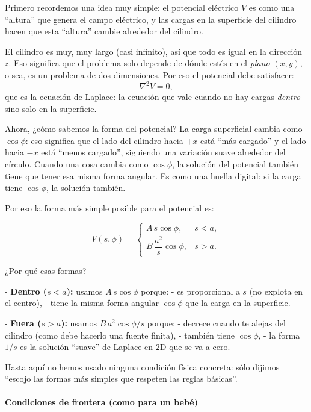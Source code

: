 \documentclass{article}
\begin{document}
Primero recordemos una idea muy simple: el potencial eléctrico $V$ es como una 
“altura” que genera el campo eléctrico, y las cargas en la superficie del 
cilindro hacen que esta “altura” cambie alrededor del cilindro.

El cilindro es muy, muy largo (casi infinito), así que todo es igual en la 
dirección $z$. Eso significa que el problema solo depende de 
dónde estés en el \emph{plano} $(x,y)$, o sea, es un problema de dos 
dimensiones. Por eso el potencial debe satisfacer:
\[
\nabla^{2}V = 0,
\]
que es la ecuación de Laplace: la ecuación que vale cuando no hay cargas 
\emph{dentro} sino solo en la superficie.

Ahora, ¿cómo sabemos la forma del potencial?  
La carga superficial cambia como $\cos\phi$: eso significa que el lado del 
cilindro hacia $+x$ está “más cargado” y el lado hacia $-x$ está “menos 
cargado”, siguiendo una variación suave alrededor del círculo.  
Cuando una cosa cambia como $\cos\phi$, la solución del potencial también tiene
que tener esa misma forma angular. Es como una huella digital: si la carga tiene
$\cos\phi$, la solución también.

Por eso la forma más simple posible para el potencial es:

\[
V(s,\phi)
=
\begin{cases}
A\,s\cos\phi, & s<a,\\[4pt]
B\,\dfrac{a^{2}}{s}\cos\phi, & s>a.
\end{cases}
\]

¿Por qué esas formas?

- \textbf{Dentro ($s<a$):} usamos $A\,s\cos\phi$ porque:
  - es proporcional a $s$ (no explota en el centro),
  - tiene la misma forma angular $\cos\phi$ que la carga en la superficie.

- \textbf{Fuera ($s>a$):} usamos $B\,a^{2}\cos\phi/s$ porque:
  - decrece cuando te alejas del cilindro (como debe hacerlo una fuente finita),
  - también tiene $\cos\phi$,
  - la forma $1/s$ es la solución “suave” de Laplace en 2D que se va a cero.

Hasta aquí no hemos usado ninguna condición física concreta: sólo dijimos
“escojo las formas más simples que respeten las reglas básicas”.

\paragraph{Condiciones de frontera (como para un bebé)}
\end{document}
